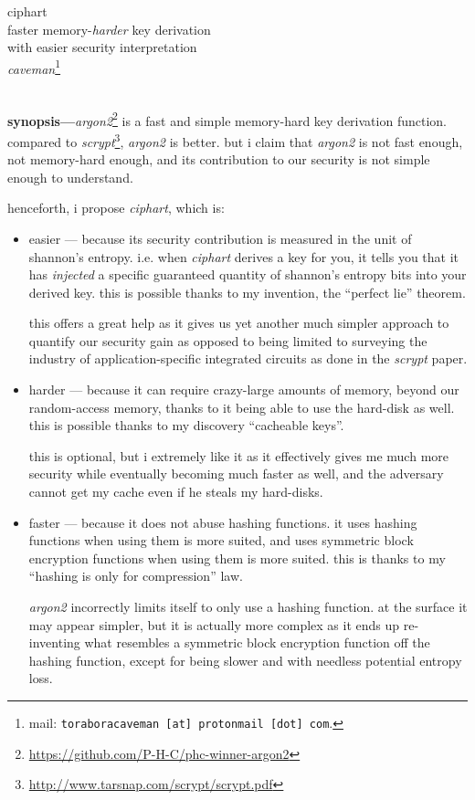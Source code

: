 \documentclass[twocolumn]{article}
\begin{document}
\SetInd{.15em}{1em}

\begin{center}
\Huge
ciphart\\
\Large
faster memory-\emph{harder} key derivation \\
with easier security interpretation\\
\normalsize
\emph{caveman}\footnote{mail: \texttt{toraboracaveman [at] protonmail [dot]
com}.}\\
\footnotesize
\DTMnow\\
\end{center}

\noindent\textbf{synopsis---}\emph{argon2}\footnote{\url{https://github.com/P-H-C/phc-winner-argon2}}
is a fast and simple memory-hard key derivation function.  compared to
\emph{scrypt}\footnote{\url{http://www.tarsnap.com/scrypt/scrypt.pdf}},
\emph{argon2} is better.  but i claim that \emph{argon2} is not fast
enough, not memory-hard enough, and its contribution to our security is not
simple enough to understand.

henceforth, i propose \emph{ciphart}, which is:
\begin{itemize}
    \item easier --- because its security contribution is measured in the
    unit of shannon's entropy.  i.e. when \emph{ciphart} derives a key for
    you, it tells you that it has \emph{injected} a specific guaranteed
    quantity of shannon's entropy bits into your derived key.  this is
    possible thanks to my invention, the ``perfect lie'' theorem.

    this offers a great help as it gives us yet another much simpler
    approach to quantify our security gain as opposed to being limited to
    surveying the industry of application-specific integrated circuits as
    done in the \emph{scrypt} paper.

    \item harder --- because it can require crazy-large amounts of memory,
    beyond our random-access memory, thanks to it being able to use the
    hard-disk as well.  this is possible thanks to my discovery ``cacheable
    keys''.

    this is optional, but i extremely like it as it effectively gives me
    much more security while eventually becoming much faster as well, and
    the adversary cannot get my cache even if he steals my hard-disks.

    \item faster --- because it does not abuse hashing functions.  it uses
    hashing functions when using them is more suited, and uses symmetric
    block encryption functions when using them is  more suited.  this is
    thanks to my ``hashing is only for compression'' law.

    \emph{argon2} incorrectly limits itself to only use a hashing function.
    at the surface it may appear simpler, but it is actually more complex
    as it ends up re-inventing what resembles a symmetric block encryption
    function off the hashing function, except for being slower and with
    needless potential entropy loss.
\end{itemize}
\end{document}

